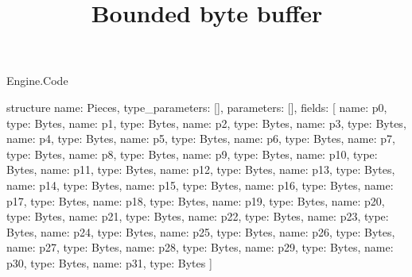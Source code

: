 \begin{lexlean}{Engine.Code}
\title{Bounded byte buffer}
\begin{semanticmodule}
structure{
  name: Pieces,
  type_parameters: [],
  parameters: [],
  fields: [
    {name: p0, type: Bytes},
    {name: p1, type: Bytes},
    {name: p2, type: Bytes},
    {name: p3, type: Bytes},
    {name: p4, type: Bytes},
    {name: p5, type: Bytes},
    {name: p6, type: Bytes},
    {name: p7, type: Bytes},
    {name: p8, type: Bytes},
    {name: p9, type: Bytes},
    {name: p10, type: Bytes},
    {name: p11, type: Bytes},
    {name: p12, type: Bytes},
    {name: p13, type: Bytes},
    {name: p14, type: Bytes},
    {name: p15, type: Bytes},
    {name: p16, type: Bytes},
    {name: p17, type: Bytes},
    {name: p18, type: Bytes},
    {name: p19, type: Bytes},
    {name: p20, type: Bytes},
    {name: p21, type: Bytes},
    {name: p22, type: Bytes},
    {name: p23, type: Bytes},
    {name: p24, type: Bytes},
    {name: p25, type: Bytes},
    {name: p26, type: Bytes},
    {name: p27, type: Bytes},
    {name: p28, type: Bytes},
    {name: p29, type: Bytes},
    {name: p30, type: Bytes},
    {name: p31, type: Bytes}
  ]
}


\end{semanticmodule}
\end{lexlean}
